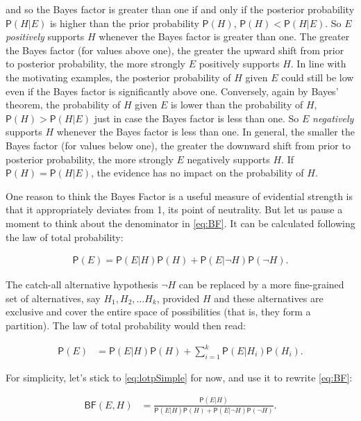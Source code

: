 \documentclass[10pt,dvipsnames,enabledeprecatedfontcommands]{scrartcl}
\newcommand{\pr}[1]{\mathsf{P}(#1)}
\begin{document}
\noindent and so the Bayes factor is greater than one if and only if the
posterior probability \(\pr{H \vert E}\) is higher than the prior
probability \(\pr{H}\), \(\pr{H}<\pr{H\vert E}\). So \(E\)
\textit{positively} supports \(H\) whenever the Bayes factor is greater
than one. The greater the Bayes factor (for values above one), the
greater the upward shift from prior to posterior probability, the more
strongly \(E\) positively supports \(H\). In line with the motivating
examples, the posterior probability of \(H\) given \(E\) could still be
low even if the Bayes factor is significantly above one. Conversely,
again by Bayes' theorem, the probability of \(H\) given \(E\) is lower
than the probability of \(H\), \(\pr{H}>\pr{H\vert E}\) just in case the
Bayes factor is less than one. So \(E\) \textit{negatively} supports
\(H\) whenever the Bayes factor is less than one. In general, the
smaller the Bayes factor (for values below one), the greater the
downward shift from prior to posterior probability, the more strongly
\(E\) negatively supports \(H\). If \(\pr{H}=\pr{H\vert E}\), the
evidence has no impact on the probability of \(H\).

One reason to think the Bayes Factor is a useful measure of evidential
strength is that it appropriately deviates from 1, its point of
neutrality. But let us pause a moment to think about the denominator in
\eqref{eq:BF}. It can be calculated following the law of total
probability:

\vspace{-3mm}

\begin{align} \label{eq:lotpSimple}
\pr{E}= \pr{E \vert H} \pr{H}+\pr{E \vert \neg H} \pr{\neg H}.
\end{align}

\noindent The catch-all alternative hypothesis \(\neg H\) can be
replaced by a more fine-grained set of alternatives, say
\(H_1, H_2, \dots H_k\), provided \(H\) and these alternatives are
exclusive and cover the entire space of possibilities (that is, they
form a partition). The law of total probability would then read:

\begin{align} \label{eq:lotpLong}
\pr{E} & = \pr{E\vert H}\pr{H} +\sum_{i=1}^k \pr{E\vert H_i}\pr{H_i}. 
\end{align}

\noindent For simplicity, let's stick to \eqref{eq:lotpSimple} for now,
and use it to rewrite \eqref{eq:BF}:

\begin{align}\label{eq:BFlotp}
\mathsf{BF}(E,H) & = \frac{\pr{E \vert H}}{\pr{E \vert H} \pr{H}+\pr{E \vert \neg H} \pr{\neg H}}.
\end{align}
\end{document}
